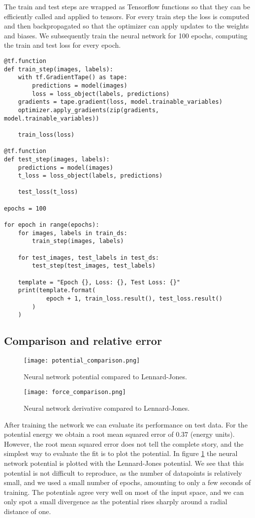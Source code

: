The train and test steps are wrapped as  Tensorflow functions
so that they can be efficiently called and applied to tensors.
For every train step the loss is computed and then backpropagated
so that the optimizer can apply updates to the weights and biases.
We subsequently train the neural network for 100 epochs, computing
the train and test loss for every epoch.

\begin{verbatim}
@tf.function
def train_step(images, labels):
    with tf.GradientTape() as tape:
        predictions = model(images)
        loss = loss_object(labels, predictions)
    gradients = tape.gradient(loss, model.trainable_variables)
    optimizer.apply_gradients(zip(gradients, model.trainable_variables))

    train_loss(loss)

@tf.function
def test_step(images, labels):
    predictions = model(images)
    t_loss = loss_object(labels, predictions)

    test_loss(t_loss)

epochs = 100

for epoch in range(epochs):
    for images, labels in train_ds:
        train_step(images, labels)

    for test_images, test_labels in test_ds:
        test_step(test_images, test_labels)

    template = "Epoch {}, Loss: {}, Test Loss: {}"
    print(template.format(
            epoch + 1, train_loss.result(), test_loss.result()
        )
    )
\end{verbatim}

\subsection{Comparison and relative error}

\begin{figure}[H]
    \centering
    \texttt{[image: potential\_comparison.png]}
    \caption{Neural network potential compared to Lennard-Jones.}
    \label{fig:potential-comparison}
\end{figure}

\begin{figure}[H]
    \centering
    \texttt{[image: force\_comparison.png]}
    \caption{Neural network derivative compared to Lennard-Jones.}
    \label{fig:force-comparison}
\end{figure}

After training the network we can evaluate its performance
on test data. 
For the potential energy we obtain a root mean squared error of
$0.37$ (energy units).
However, the root mean squared error does not tell the complete story,
and the simplest way to evaluate the fit is to plot the potential.
In figure \ref{fig:potential-comparison} the neural network potential
is plotted with the Lennard-Jones potential.
We see that this potential is not difficult to reproduce,
as the number of datapoints is relatively small, and we used
a small number of epochs, amounting to only a few seconds of training.
The potentials agree very well on most of the input space, and we can
only spot a small divergence as the potential rises sharply
around a radial distance of one.

